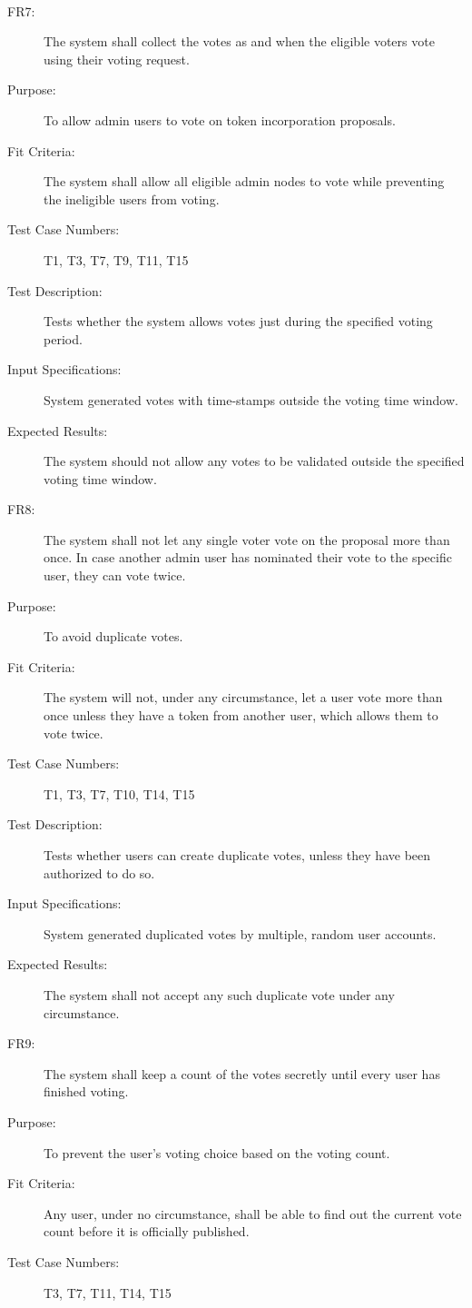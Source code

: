 \documentclass[a4paper,twoside,phd]{BYUPhys}
\begin{document}
\begin{description}
\\
\item[FR7:] The system shall collect the votes as and when the eligible voters vote using their voting request.
\item[Purpose:] To allow admin users to vote on token incorporation proposals.
\item[Fit Criteria:] The system shall allow all eligible admin nodes to vote while preventing the ineligible users from voting.
\item[Test Case Numbers:] T1, T3, T7, T9, T11, T15
\item[Test Description:] Tests whether the system allows votes just during the specified voting period.
\item[Input Specifications:] System generated votes with time-stamps outside the voting time window.
\item[Expected Results:] The system should not allow any votes to be validated outside the specified voting time window.
\\
\item[FR8:] The system shall not let any single voter vote on the proposal more than once. In case another admin user has nominated their vote to the specific user, they can vote twice.
\item[Purpose:] To avoid duplicate votes.
\item[Fit Criteria:] The system will not, under any circumstance, let a user vote more than once unless they have a token from another user, which allows them to vote twice.
\item[Test Case Numbers:] T1, T3, T7, T10, T14, T15
\item[Test Description:] Tests whether users can create duplicate votes, unless they have been authorized to do so.
\item[Input Specifications:] System generated duplicated votes by multiple, random user accounts.
\item[Expected Results:] The system shall not accept any such duplicate vote under any circumstance.
\\
\item[FR9:] The system shall keep a count of the votes secretly until every user has finished voting.
\item[Purpose:] To prevent the user's voting choice based on the voting count.
\item[Fit Criteria:] Any user, under no circumstance, shall be able to find out the current vote count before it is officially published.
\item[Test Case Numbers:] T3, T7, T11, T14, T15

\end{description}
\end{document}
